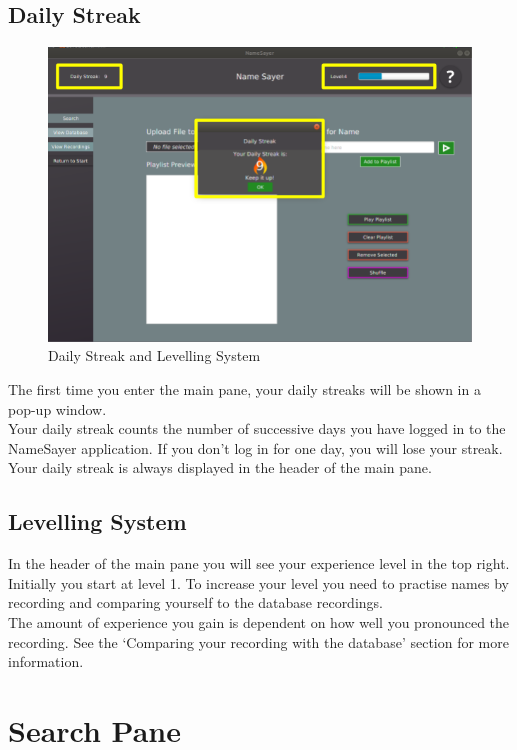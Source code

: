 \documentclass[a4paper,12pt]{article}
\begin{document}
\subsection{Daily Streak}
\begin{figure}[!h]
	\includegraphics[width=\linewidth]{streaks.png}
	\caption{Daily Streak and Levelling System}
\end{figure}
The first time you enter the main pane, your daily streaks will be shown in a pop-up window.
\\


Your daily streak counts the number of successive days you have logged in to the NameSayer application. If you don’t log in for one day, you will lose your streak. 
\\


Your daily streak is always displayed in the header of the main pane.
\subsection{Levelling System}
In the header of the main pane you will see your experience level in the top right.
\\


Initially you start at level 1. To increase your level you need to practise names by recording and comparing yourself to the database recordings. 
\\

The amount of experience you gain is dependent on how well you pronounced the recording. See the ‘Comparing your recording with the database’ section for more information. 

\section{Search Pane} 
\end{document}
